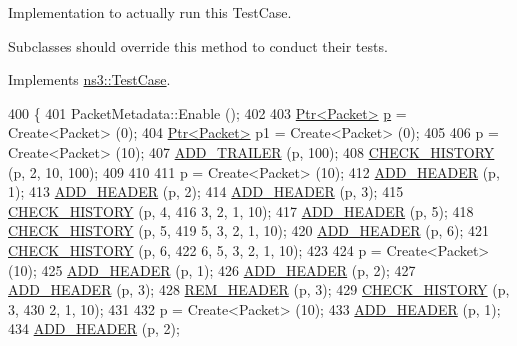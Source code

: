 Implementation to actually run this Test\+Case. 

Subclasses should override this method to conduct their tests. 

Implements \hyperlink{classns3_1_1TestCase_a8ff74680cf017ed42011e4be51917a24}{ns3\+::\+Test\+Case}.


\begin{DoxyCode}
400 \{
401   PacketMetadata::Enable ();
402 
403   \hyperlink{classns3_1_1Ptr}{Ptr<Packet>} \hyperlink{lte__link__budget_8m_ac9de518908a968428863f829398a4e62}{p} = Create<Packet> (0);
404   \hyperlink{classns3_1_1Ptr}{Ptr<Packet>} p1 = Create<Packet> (0);
405 
406   p = Create<Packet> (10);
407   \hyperlink{packet-metadata-test_8cc_ab10bc130bb7184d47509ea44f4fb24df}{ADD\_TRAILER} (p, 100);
408   \hyperlink{packet-metadata-test_8cc_a15a730e778d9d498a39e778bcd39684c}{CHECK\_HISTORY} (p, 2, 10, 100);
409 
410 
411   p = Create<Packet> (10);
412   \hyperlink{packet-metadata-test_8cc_a120012d48d29d678b3138d5c7b9bf714}{ADD\_HEADER} (p, 1);
413   \hyperlink{packet-metadata-test_8cc_a120012d48d29d678b3138d5c7b9bf714}{ADD\_HEADER} (p, 2);
414   \hyperlink{packet-metadata-test_8cc_a120012d48d29d678b3138d5c7b9bf714}{ADD\_HEADER} (p, 3);
415   \hyperlink{packet-metadata-test_8cc_a15a730e778d9d498a39e778bcd39684c}{CHECK\_HISTORY} (p, 4, 
416                  3, 2, 1, 10);
417   \hyperlink{packet-metadata-test_8cc_a120012d48d29d678b3138d5c7b9bf714}{ADD\_HEADER} (p, 5);
418   \hyperlink{packet-metadata-test_8cc_a15a730e778d9d498a39e778bcd39684c}{CHECK\_HISTORY} (p, 5, 
419                  5, 3, 2, 1, 10);
420   \hyperlink{packet-metadata-test_8cc_a120012d48d29d678b3138d5c7b9bf714}{ADD\_HEADER} (p, 6);
421   \hyperlink{packet-metadata-test_8cc_a15a730e778d9d498a39e778bcd39684c}{CHECK\_HISTORY} (p, 6, 
422                  6, 5, 3, 2, 1, 10);
423 
424   p = Create<Packet> (10);
425   \hyperlink{packet-metadata-test_8cc_a120012d48d29d678b3138d5c7b9bf714}{ADD\_HEADER} (p, 1);
426   \hyperlink{packet-metadata-test_8cc_a120012d48d29d678b3138d5c7b9bf714}{ADD\_HEADER} (p, 2);
427   \hyperlink{packet-metadata-test_8cc_a120012d48d29d678b3138d5c7b9bf714}{ADD\_HEADER} (p, 3);
428   \hyperlink{packet-metadata-test_8cc_a8694c61c9ba33c72896dde3628538a84}{REM\_HEADER} (p, 3);
429   \hyperlink{packet-metadata-test_8cc_a15a730e778d9d498a39e778bcd39684c}{CHECK\_HISTORY} (p, 3, 
430                  2, 1, 10);
431 
432   p = Create<Packet> (10);
433   \hyperlink{packet-metadata-test_8cc_a120012d48d29d678b3138d5c7b9bf714}{ADD\_HEADER} (p, 1);
434   \hyperlink{packet-metadata-test_8cc_a120012d48d29d678b3138d5c7b9bf714}{ADD\_HEADER} (p, 2);

\end{DoxyCode}
